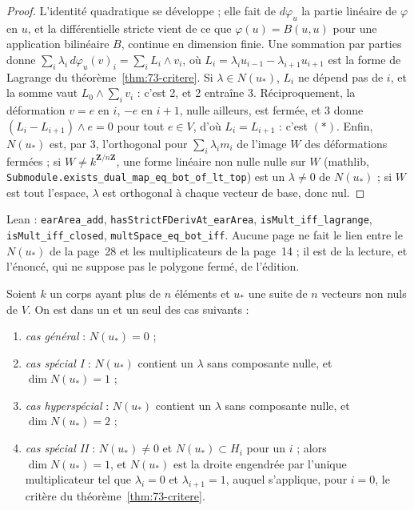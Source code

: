 \begin{proof}
L'identité quadratique se développe ; elle fait de $d\varphi_u$ la partie linéaire de $\varphi$ en $u$, et la différentielle stricte vient de ce que $\varphi(u) = B(u, u)$ pour une application bilinéaire $B$, continue en dimension finie. Une sommation par parties donne $\sum_i \lambda_i\, d\varphi_u(v)_i = \sum_i L_i \wedge v_i$, où $L_i = \lambda_i u_{i-1} - \lambda_{i+1} u_{i+1}$ est la forme de Lagrange du théorème~\ref{thm:73-critere}. Si $\lambda \in N(u_*)$, $L_i$ ne dépend pas de $i$, et la somme vaut $L_0 \wedge \sum_i v_i$ : c'est 2, et 2 entraîne 3. Réciproquement, la déformation $v = e$ en $i$, $-e$ en $i + 1$, nulle ailleurs, est fermée, et 3 donne $(L_i - L_{i+1}) \wedge e = 0$ pour tout $e \in V$, d'où $L_i = L_{i+1}$ : c'est $(\ast)$. Enfin, $N(u_*)$ est, par 3, l'orthogonal pour $\sum_i \lambda_i m_i$ de l'image $W$ des déformations fermées ; si $W \neq k^{\mathbf{Z}/n\mathbf{Z}}$, une forme linéaire non nulle nulle sur $W$ (mathlib, \texttt{Submodule.\allowbreak{}exists\_dual\_map\_eq\_bot\_of\_lt\_top}) est un $\lambda \neq 0$ de $N(u_*)$ ; si $W$ est tout l'espace, $\lambda$ est orthogonal à chaque vecteur de base, donc nul.
\end{proof}

Lean : \texttt{earArea\_add}, \texttt{hasStrictFDerivAt\_earArea}, \texttt{isMult\_iff\_lagrange}, \texttt{isMult\_iff\_closed}, \texttt{multSpace\_eq\_bot\_iff}. Aucune page ne fait le lien entre le $N(u_*)$ de la page~28 et les multiplicateurs de la page~14 ; il est de la lecture, et l'énoncé, qui ne suppose pas le polygone fermé, de l'édition.

\begin{encadre}
\begin{theoreme}\label{thm:73-quatre-cas}
Soient $k$ un corps ayant plus de $n$ éléments et $u_*$ une suite de $n$ vecteurs non nuls de $V$. On est dans un et un seul des cas suivants :
\begin{enumerate}
\item[(a)] \emph{cas général} : $N(u_*) = 0$ ;
\item[(b$_1$)] \emph{cas spécial I} : $N(u_*)$ contient un $\lambda$ sans composante nulle, et $\dim N(u_*) = 1$ ;
\item[(b$_2$)] \emph{cas hyperspécial} : $N(u_*)$ contient un $\lambda$ sans composante nulle, et $\dim N(u_*) = 2$ ;
\item[(c)] \emph{cas spécial II} : $N(u_*) \neq 0$ et $N(u_*) \subset H_i$ pour un $i$ ; alors $\dim N(u_*) = 1$, et $N(u_*)$ est la droite engendrée par l'unique multiplicateur tel que $\lambda_i = 0$ et $\lambda_{i+1} = 1$, auquel s'applique, pour $i = 0$, le critère du théorème~\ref{thm:73-critere}.
\end{enumerate}
\end{theoreme}
\end{encadre}

